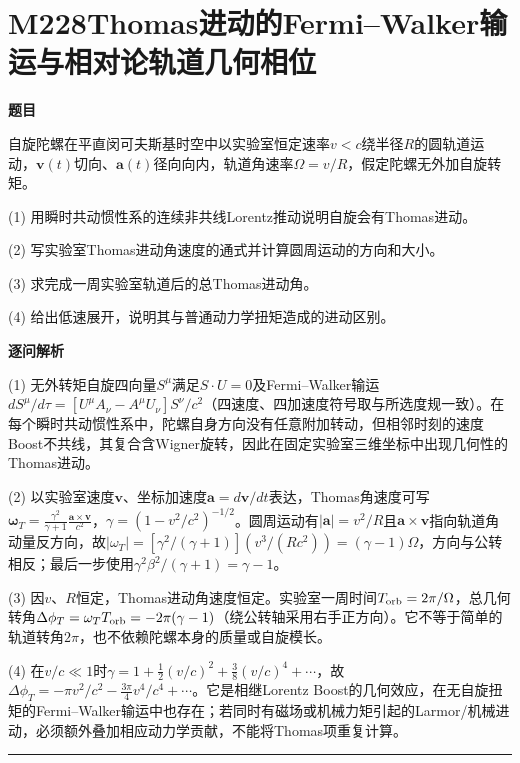 \documentclass[UTF8,a4paper,11pt,oneside,openany]{ctexbook}
\begin{document}
\section*{M228\quad Thomas进动的Fermi–Walker输运与相对论轨道几何相位}
\textbf{题目}\par
自旋陀螺在平直闵可夫斯基时空中以实验室恒定速率$v<c$绕半径$R$的圆轨道运动，$\boldsymbol v(t)$切向、$\boldsymbol a(t)$径向向内，轨道角速率$\Omega=v/R$，假定陀螺无外加自旋转矩。
\par\smallskip\noindent (1) 用瞬时共动惯性系的连续非共线Lorentz推动说明自旋会有Thomas进动。
\par\smallskip\noindent (2) 写实验室Thomas进动角速度的通式并计算圆周运动的方向和大小。
\par\smallskip\noindent (3) 求完成一周实验室轨道后的总Thomas进动角。
\par\smallskip\noindent (4) 给出低速展开，说明其与普通动力学扭矩造成的进动区别。
\par\medskip\textbf{逐问解析}\par
\par\smallskip\noindent (1) 无外转矩自旋四向量$S^\mu$满足$S\cdot U=0$及Fermi–Walker输运$dS^\mu/d\tau=[U^\mu A_\nu-A^\mu U_\nu]S^\nu/c^2$（四速度、四加速度符号取与所选度规一致）。在每个瞬时共动惯性系中，陀螺自身方向没有任意附加转动，但相邻时刻的速度Boost不共线，其复合含Wigner旋转，因此在固定实验室三维坐标中出现几何性的Thomas进动。
\par\smallskip\noindent (2) 以实验室速度$\boldsymbol v$、坐标加速度$\boldsymbol a=d\boldsymbol v/dt$表达，Thomas角速度可写$\boldsymbol\omega_T=\frac{\gamma^2}{\gamma+1}\frac{\boldsymbol a\times\boldsymbol v}{c^2}$，$\gamma=(1-v^2/c^2)^{-1/2}$。圆周运动有$|\boldsymbol a|=v^2/R$且$\boldsymbol a\times\boldsymbol v$指向轨道角动量反方向，故$|\omega_T|=[\gamma^2/(\gamma+1)](v^3/(Rc^2))=(\gamma-1)\Omega$，方向与公转相反；最后一步使用$\gamma^2\beta^2/(\gamma+1)=\gamma-1$。
\par\smallskip\noindent (3) 因$v$、$R$恒定，Thomas进动角速度恒定。实验室一周时间$T_{\rm orb}=2\pi/\Omega$，总几何转角$\Delta\phi_T=\omega_T T_{\rm orb}=-2\pi(\gamma-1)$（绕公转轴采用右手正方向）。它不等于简单的轨道转角$2\pi$，也不依赖陀螺本身的质量或自旋模长。
\par\smallskip\noindent (4) 在$v/c\ll1$时$\gamma=1+\frac12(v/c)^2+\frac38(v/c)^4+\cdots$，故$\Delta\phi_T=-\pi v^2/c^2-\frac{3\pi}{4}v^4/c^4+\cdots$。它是相继Lorentz Boost的几何效应，在无自旋扭矩的Fermi–Walker输运中也存在；若同时有磁场或机械力矩引起的Larmor/机械进动，必须额外叠加相应动力学贡献，不能将Thomas项重复计算。
\par\medskip\hrule\medskip
\end{document}
